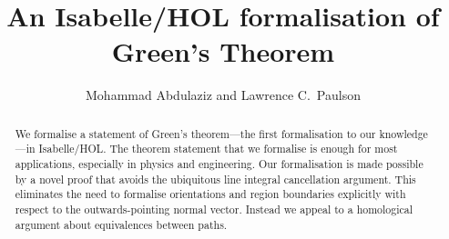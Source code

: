 \documentclass[11pt,a4paper]{article}
\begin{document}
\title{An Isabelle/HOL formalisation of Green's Theorem}
\author{Mohammad Abdulaziz and Lawrence C.\ Paulson}
\maketitle

\begin{abstract}
  We formalise a statement of Green’s theorem—the first formalisation to
  our knowledge—in Isabelle/HOL. The theorem statement that we formalise
  is enough for most applications, especially in physics and
  engineering. Our formalisation is made possible by a novel proof that
  avoids the ubiquitous line integral cancellation argument. This
  eliminates the need to formalise orientations and region boundaries
  explicitly with respect to the outwards-pointing normal vector.
  Instead we appeal to a homological argument about equivalences between
  paths.
\end{abstract}






\end{document}
